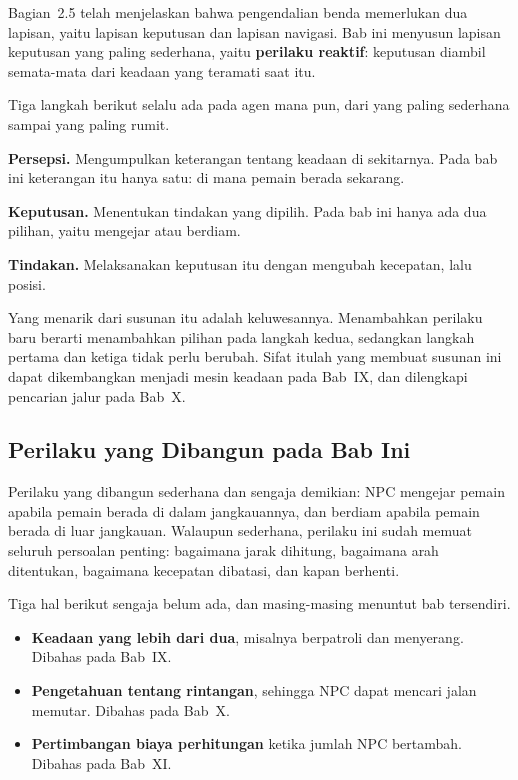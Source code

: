 Bagian~2.5 telah menjelaskan bahwa pengendalian benda memerlukan dua lapisan,
yaitu lapisan keputusan dan lapisan navigasi. Bab ini menyusun lapisan
keputusan yang paling sederhana, yaitu \textbf{perilaku reaktif}: keputusan
diambil semata-mata dari keadaan yang teramati saat itu.

Tiga langkah berikut selalu ada pada agen mana pun, dari yang paling sederhana
sampai yang paling rumit.

\begin{langkah}
  \item \textbf{Persepsi.} Mengumpulkan keterangan tentang keadaan di
        sekitarnya. Pada bab ini keterangan itu hanya satu: di mana pemain
        berada sekarang.
  \item \textbf{Keputusan.} Menentukan tindakan yang dipilih. Pada bab ini
        hanya ada dua pilihan, yaitu mengejar atau berdiam.
  \item \textbf{Tindakan.} Melaksanakan keputusan itu dengan mengubah kecepatan,
        lalu posisi.
\end{langkah}

Yang menarik dari susunan itu adalah keluwesannya. Menambahkan perilaku baru
berarti menambahkan pilihan pada langkah kedua, sedangkan langkah pertama dan
ketiga tidak perlu berubah. Sifat itulah yang membuat susunan ini dapat
dikembangkan menjadi mesin keadaan pada Bab~IX, dan dilengkapi pencarian jalur
pada Bab~X.

\subsection{Perilaku yang Dibangun pada Bab Ini}

Perilaku yang dibangun sederhana dan sengaja demikian: NPC mengejar pemain
apabila pemain berada di dalam jangkauannya, dan berdiam apabila pemain berada
di luar jangkauan. Walaupun sederhana, perilaku ini sudah memuat seluruh
persoalan penting: bagaimana jarak dihitung, bagaimana arah ditentukan,
bagaimana kecepatan dibatasi, dan kapan berhenti.

Tiga hal berikut sengaja belum ada, dan masing-masing menuntut bab tersendiri.

\begin{itemize}
  \item \textbf{Keadaan yang lebih dari dua}, misalnya berpatroli dan
        menyerang. Dibahas pada Bab~IX.
  \item \textbf{Pengetahuan tentang rintangan}, sehingga NPC dapat mencari
        jalan memutar. Dibahas pada Bab~X.
  \item \textbf{Pertimbangan biaya perhitungan} ketika jumlah NPC bertambah.
        Dibahas pada Bab~XI.
\end{itemize}
